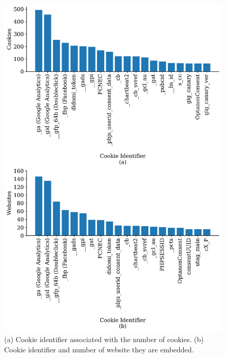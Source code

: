 \begin{center}
\begin{figure}
    \centering
    \includegraphics[width=\linewidth]{figures/cookie_analysis_combined.pdf}
    \caption{(a) Cookie identifier associated with the number of cookies. (b) Cookie identifier and number of website they are embedded.}
\label{fig:cookie_website}
\end{figure}
\end{center}


